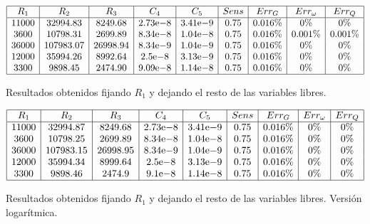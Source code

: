 \documentclass{llncs}
\newcommand{\expnumber}[2]{{#1}\mathrm{e}{#2}}
\begin{document}
	\begin{table}[H]
		$$
		\begin{array}{|c|c|c|c|c|c|c|c|c|c|}
		\hline
		R_1 & R_2 & R_3 & C_4 & C_5 & Sens & Err_G & Err_\omega & Err_Q \\
		\hline
		11000 & 32994.83 & 8249.68 & \expnumber{2.73}{-8} & \expnumber{3.41}{-9} & 0.75 & 0.016\% & 0\% & 0\% \\
		3600 & 10798.31 & 2699.89 & \expnumber{8.34}{-8} & \expnumber{1.04}{-8} & 0.75 & 0.016\% & 0.001\% & 0.001\% \\
		36000 & 107983.07 & 26998.94 & \expnumber{8.34}{-9} & \expnumber{1.04}{-9} & 0.75 & 0.016\% & 0\% & 0\% \\
		12000 & 35994.26 & 8992.64 & \expnumber{2.5}{-8} & \expnumber{3.13}{-9} & 0.75 & 0.016\% & 0\% & 0\% \\
		3300 & 9898.45 & 2474.90 & \expnumber{9.09}{-8} & \expnumber{1.14}{-8} & 0.75 & 0.016\% & 0\% & 0\% \\
		\hline
		\end{array}
		$$
		\caption{Resultados obtenidos fijando $R_1$ y dejando el resto de las variables libres.}
		\label{cuadroSolsCom}
	\end{table}

	\begin{table}[H]
		$$
		\begin{array}{|c|c|c|c|c|c|c|c|c|c|}
		\hline
		R_1 & R_2 & R_3 & C_4 & C_5 & Sens & Err_G & Err_\omega & Err_Q \\
		\hline
		11000 & 32994.87 & 8249.68 & \expnumber{2.73}{-8} & \expnumber{3.41}{-9} & 0.75 & 0.016\% & 0\% & 0\% \\
		3600 & 10798.25 & 2699.89 & \expnumber{8.34}{-8} & \expnumber{1.04}{-8} & 0.75 & 0.016\% & 0\% & 0\% \\
		36000 & 107983.15 & 26998.95 & \expnumber{8.34}{-9} & \expnumber{1.04}{-9} & 0.75 & 0.016\% & 0\% & 0\% \\
		12000 & 35994.34 & 8999.64 & \expnumber{2.5}{-8} & \expnumber{3.13}{-9} & 0.75 & 0.016\% & 0\% & 0\% \\
		3300 & 9898.46 & 2474.9 & \expnumber{9.1}{-8} & \expnumber{1.14}{-8} & 0.75 & 0.016\% & 0\% & 0\% \\
		\hline
		\end{array}
		$$
		\caption{Resultados obtenidos fijando $R_1$ y dejando el resto de las variables libres. Versión logarítmica.}
		\label{cuadroSolsLog}
	\end{table}
	
\end{document}
